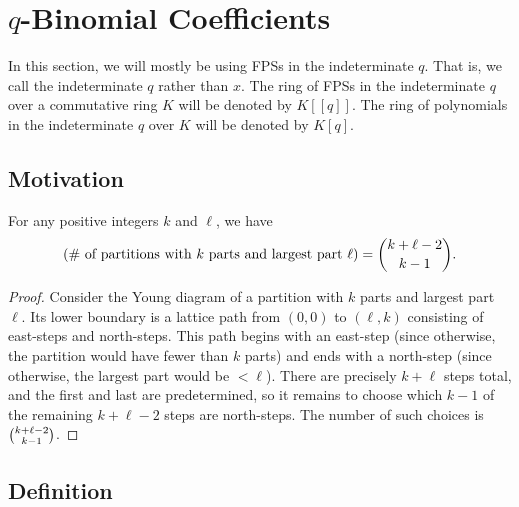 \section{$q$-Binomial Coefficients}

\begin{convention}
\label{conv.pars.qbinom.q}
In this section, we will mostly be using FPSs in the
indeterminate $q$. That is, we call the indeterminate $q$ rather than $x$.
The ring of FPSs in the indeterminate $q$ over a commutative ring $K$ will be
denoted by $K[[q]]$. The ring of polynomials in
the indeterminate $q$ over $K$ will be denoted by $K[q]$.
\end{convention}

\subsection{Motivation}

\begin{proposition}
\label{prop.pars.qbinom.intro-count-binom}
\leantarget
\leanok
For any positive integers $k$ and $\ell$, we have
\[
\left(\text{\# of partitions with }k\text{ parts and largest part }\ell\right)
= \dbinom{k+\ell-2}{k-1}.
\]
\end{proposition}

\begin{proof}
Consider the Young diagram of a partition with $k$ parts and largest part $\ell$.
Its lower boundary is a lattice path from $(0,0)$ to $(\ell,k)$
consisting of east-steps and north-steps. This path begins with an
east-step (since otherwise, the partition would have fewer than $k$ parts) and
ends with a north-step (since otherwise, the largest part would be $<\ell$).
There are precisely $k+\ell$ steps total, and the first and last are
predetermined, so it remains to choose which $k-1$ of the remaining $k+\ell-2$
steps are north-steps. The number of such choices is $\dbinom{k+\ell-2}{k-1}$.
\end{proof}

\subsection{Definition}


